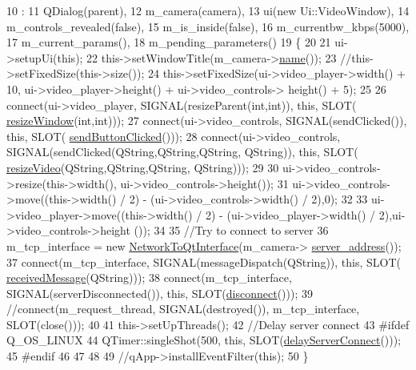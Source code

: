 \begin{DoxyCode}
10                                                         :
11     QDialog(parent),
12     m\_camera(camera),
13     ui(\textcolor{keyword}{new} Ui::VideoWindow),
14     m\_controls\_revealed(\textcolor{keyword}{false}),
15     m\_is\_inside(\textcolor{keyword}{false}),
16     m\_currentbw\_kbps(5000),
17     m\_current\_params(),
18     m\_pending\_parameters()
19 \{   
20 
21     ui->setupUi(\textcolor{keyword}{this});
22     this->setWindowTitle(m\_camera->\hyperlink{classCamera_a5763757e8d6adb6437dde2502072a3b1}{name}());
23     \textcolor{comment}{//this->setFixedSize(this->size());}
24     this->setFixedSize(ui->video\_player->width() + 10, ui->video\_player->height() + ui->video\_controls->
      height() + 5);
25 
26     connect(ui->video\_player, SIGNAL(resizeParent(\textcolor{keywordtype}{int},\textcolor{keywordtype}{int})), \textcolor{keyword}{this}, SLOT(
      \hyperlink{classVideoWindow_a5035f10be178cfc311d637c19938a344}{resizeWindow}(\textcolor{keywordtype}{int},\textcolor{keywordtype}{int})));
27     connect(ui->video\_controls, SIGNAL(sendClicked()), \textcolor{keyword}{this}, SLOT(
      \hyperlink{classVideoWindow_a655194e6449c76e200135c88f8fafd7d}{sendButtonClicked}()));
28     connect(ui->video\_controls, SIGNAL(sendClicked(QString,QString,QString, QString)), \textcolor{keyword}{this}, SLOT(
      \hyperlink{classVideoWindow_ac07f4db8a805849174cb129134708fd4}{resizeVideo}(QString,QString,QString, QString)));
29 
30     ui->video\_controls->resize(this->width(), ui->video\_controls->height());
31     ui->video\_controls->move((this->width() / 2) - (ui->video\_controls->width() / 2),0);
32 
33     ui->video\_player->move((this->width() / 2) - (ui->video\_player->width() / 2),ui->video\_controls->height
      ());
34 
35     \textcolor{comment}{//Try to connect to server}
36     m\_tcp\_interface = \textcolor{keyword}{new} \hyperlink{classNetworkToQtInterface}{NetworkToQtInterface}(m\_camera->
      \hyperlink{classCamera_aa93654bec9b65adfb95e192ac9c71e80}{server\_address}());
37     connect(m\_tcp\_interface, SIGNAL(messageDispatch(QString)), \textcolor{keyword}{this}, SLOT(
      \hyperlink{classVideoWindow_ab25ad37e9dfdb92f46212d4309d4232f}{receivedMessage}(QString)));
38     connect(m\_tcp\_interface, SIGNAL(serverDisconnected()), \textcolor{keyword}{this}, SLOT(\hyperlink{classVideoWindow_a68b4f26c999360c30b12cc70347393c7}{disconnect}()));
39     \textcolor{comment}{//connect(m\_request\_thread, SIGNAL(destroyed()), m\_tcp\_interface, SLOT(close()));}
40 
41     this->setUpThreads();
42     \textcolor{comment}{//Delay server connect}
43 \textcolor{preprocessor}{#ifdef Q\_OS\_LINUX}
44 \textcolor{preprocessor}{}    QTimer::singleShot(500, \textcolor{keyword}{this}, SLOT(\hyperlink{classVideoWindow_a55220de4b6b3b8e2575201c933932059}{delayServerConnect}()));
45 \textcolor{preprocessor}{#endif}
46 \textcolor{preprocessor}{}
47 
48 
49     \textcolor{comment}{//qApp->installEventFilter(this);}
50 \}
\end{DoxyCode}
